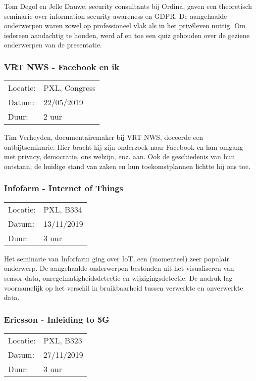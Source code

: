 Tom Degol en Jelle Dauwe, security consultants bij Ordina, gaven een theoretisch seminarie over information security awareness en GDPR. De aangehaalde onderwerpen waren zowel op professioneel vlak als in het privéleven nuttig. Om iedereen aandachtig te houden, werd af en toe een quiz gehouden over de geziene onderwerpen van de presentatie.

\subsubsection{VRT NWS - Facebook en ik}

\begin{tabular}{l l}
  Locatie: & PXL, Congress\\
  Datum: & 22/05/2019\\
  Duur: & 2 uur
\end{tabular}

Tim Verheyden, documentairemaker bij VRT NWS, doceerde een ontbijtseminarie. Hier bracht hij zijn onderzoek naar Facebook en hun omgang met privacy, democratie, ons welzijn, enz. aan. Ook de geschiedenis van hun ontstaan, de huidige stand van zaken en hun toekomstplannen lichtte hij ons toe.

\subsubsection{Infofarm - Internet of Things}

\begin{tabular}{l l}
  Locatie: & PXL, B334\\
  Datum: & 13/11/2019\\
  Duur: & 3 uur
\end{tabular}

Het seminarie van Inforfarm ging over IoT, een (momenteel) zeer populair onderwerp. De aangehaalde onderwerpen bestonden uit het visualiseren van sensor data, onregelmatigheidsdetectie en wijzigingsdetectie. De nadruk lag voornamelijk op het verschil in bruikbaarheid tussen verwerkte en onverwerkte data.

\subsubsection{Ericsson - Inleiding to 5G}

\begin{tabular}{l l}
  Locatie: & PXL, B323\\
  Datum: & 27/11/2019\\
  Duur: & 3 uur
\end{tabular}

